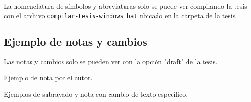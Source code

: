 
La nomenclatura de símbolos y abreviaturas solo se puede ver compilando la tesis con el archivo \verb|compilar-tesis-windows.bat| ubicado en la carpeta de la tesis.

\subsection{Ejemplo de notas y cambios}
Las notas y cambios solo se pueden ver con la opción "draft" de la tesis.

Ejemplo de nota por el autor.

Ejemplos de subrayado y nota con cambio de texto específico.



